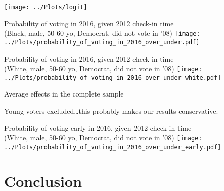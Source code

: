 \documentclass{beamer}
\begin{document}
	
		\begin{frame}
		\centering 
		\texttt{[image: ../Plots/logit]}			
		\end{frame}

		\begin{frame}				
			\centering
			Probability of voting in 2016, given 2012 check-in time \\
			(Black, male, 50-60 yo, Democrat, did not vote in '08)
			\texttt{[image: ../Plots/probability\_of\_voting\_in\_2016\_over\_under.pdf]}
		\end{frame}
		
		
		\begin{frame}				
                  \centering
			Probability of voting in 2016, given 2012 check-in time \\
			(White, male, 50-60 yo, Democrat, did not vote in '08)
			\texttt{[image: ../Plots/probability\_of\_voting\_in\_2016\_over\_under\_white.pdf]}
                      \end{frame}
                
                      
                      \begin{frame}	
                        Average effects in the complete sample
                        \footnotesize
                      \end{frame}

                      \begin{frame}	
                        Young voters excluded\ldots this probably
                        makes our results conservative.
                      \end{frame}
                      



		\begin{frame}				
                  \centering
			Probability of voting early in 2016, given 2012 check-in time \\
			(White, male, 50-60 yo, Democrat, did not vote in '08)
			\texttt{[image: ../Plots/probability\_of\_voting\_in\_2016\_over\_under\_early.pdf]}
                      \end{frame}




              \section{Conclusion}
	
\end{document}
